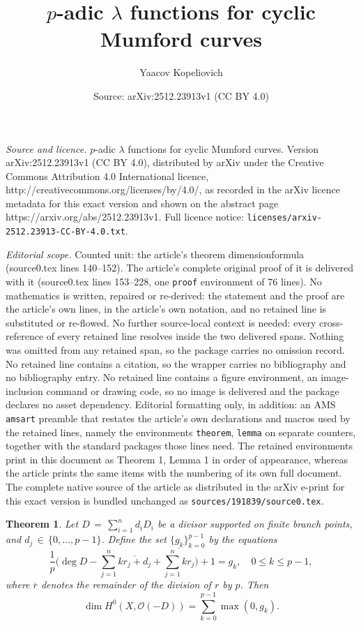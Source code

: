 \documentclass[10pt,a4paper]{amsart}
\title{$p$-adic $\lambda$ functions for cyclic Mumford curves}
\author{Yaacov Kopeliovich}
\date{Source: arXiv:2512.23913v1 (CC BY 4.0)}
\newtheorem{theorem}{Theorem}
\begin{document}
\maketitle

\noindent\emph{Source and licence.} $p$-adic $\lambda$ functions for cyclic Mumford curves. Version arXiv:2512.23913v1 (CC BY 4.0), distributed by arXiv under the Creative Commons Attribution 4.0 International licence, http://creativecommons.org/licenses/by/4.0/, as recorded in the arXiv licence metadata for this exact version and shown on the abstract page https://arxiv.org/abs/2512.23913v1. Full licence notice: \texttt{licenses/arxiv-2512.23913-CC-BY-4.0.txt}.\par\smallskip

\noindent\textit{Editorial scope.} Counted unit: the article's theorem dimensionformula (source0.tex lines 140--152). The article's complete original proof of it is delivered with it (source0.tex lines 153--228, one \texttt{proof} environment of 76 lines). No mathematics is written, repaired or re-derived: the statement and the proof are the article's own lines, in the article's own notation, and no retained line is substituted or re-flowed.  No further source-local context is needed: every cross-reference of every retained line resolves inside the two delivered spans.  Nothing was omitted from any retained span, so the package carries no omission record.  No retained line contains a citation, so the wrapper carries no bibliography and no bibliography entry.  No retained line contains a figure environment, an image-inclusion command or drawing code, so no image is delivered and the package declares no asset dependency.  Editorial formatting only, in addition: an AMS \texttt{amsart} preamble that restates the article's own declarations and macros used by the retained lines, namely the environments \texttt{theorem}, \texttt{lemma} on separate counters, together with the standard packages those lines need.  The retained environments print in this document as Theorem 1, Lemma 1 in order of appearance, whereas the article prints the same items with the numbering of its own full document.  The complete native source of the article as distributed in the arXiv e-print for this exact version is bundled unchanged as \texttt{sources/191839/source0.tex}.
\begin{theorem}\label{dimensionformula}
Let $D\,{=}\,\sum_{i=1}^n d_i D_i$ be a divisor supported on finite branch points, 
and $d_j \,{\in}\, \{0,\dots,p-1\}$. 
Define the set  $\{g_k\}_{k=0}^{p-1}$ by the equations 
\begin{equation}
\frac{1}{p}\bigg(\deg D-\sum_{j=1}^n \overline{k r_j + d_j}
+\overline{\sum_{j=1}^n k r_j}\bigg) +1=g_k,\quad   0\leq k\leq p-1,
\end{equation}
where $\overline{r}$ denotes the remainder of the division of $r$ by $p$. Then 
\begin{equation}
\dim H^{0}(X,\mathcal{O}(-D))=\sum_{k=0}^{p-1} \max(0,g_k).
\end{equation}
\end{theorem}
\end{document}
